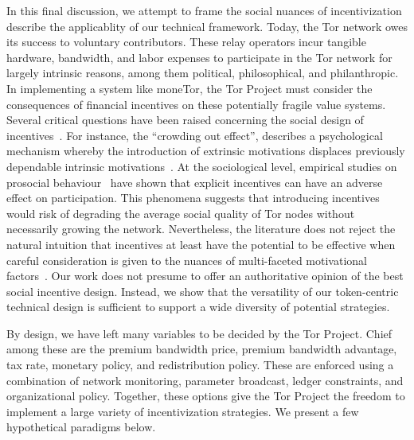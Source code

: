 In this final discussion, we attempt to frame the social nuances of incentivization describe the applicablity of our technical framework.
Today, the Tor network owes its success to voluntary contributors.
These relay operators incur tangible hardware, bandwidth, and labor expenses to participate in the Tor network for largely intrinsic reasons, among them political, philosophical, and philanthropic.
In implementing a system like moneTor, the Tor Project must consider the consequences of financial incentives on these potentially fragile value systems.
Several critical questions have been raised concerning the social design of incentives~\cite{jansenblogpost}.
For instance, the ``crowding out effect'', describes a psychological mechanism whereby the introduction of extrinsic motivations displaces previously dependable intrinsic motivations~\cite{10.1257/jep.25.4.191}.
At the sociological level, empirical studies on prosocial behaviour~\cite{10.1257/aer.96.5.1652} have shown that explicit incentives can have an adverse effect on participation.
This phenomena suggests that introducing incentives would risk of degrading the average social quality of Tor nodes without necessarily growing the network.
Nevertheless, the literature does not reject the natural intuition that incentives at least have the potential to be effective when careful consideration is given to the nuances of multi-faceted motivational factors~\cite{10.1257/aer.96.5.1652}.
Our work does not presume to offer an authoritative opinion of the best social incentive design.
Instead, we show that the versatility of our token-centric technical design is sufficient to support a wide diversity of potential strategies.

By design, we have left many variables to be decided by the Tor Project.
Chief among these are the premium bandwidth price, premium bandwidth advantage, tax rate, monetary policy, and redistribution policy.
These are enforced using a combination of network monitoring, parameter broadcast, ledger constraints, and organizational policy.
Together, these options give the Tor Project the freedom to implement a large variety of incentivization strategies.
We present a few hypothetical paradigms below.

